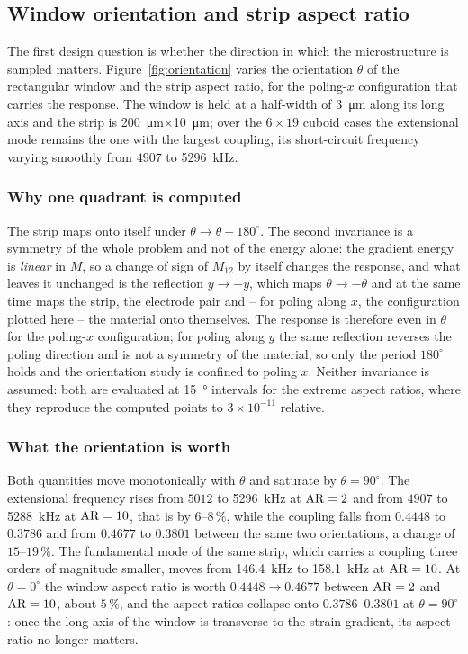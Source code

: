 

\FloatBarrier
\subsection{Window orientation and strip aspect ratio}
\label{sec:orientation}

The first design question is whether the direction in which the microstructure
is sampled matters. Figure~\ref{fig:orientation} varies the orientation
$\theta$ of the rectangular window and the strip aspect ratio, for the
poling-$x$ configuration that carries the response. The window is held at a
half-width of \SI{3}{\micro\metre} along its long axis and the strip is
\SI{200}{\micro\metre}$\times$\SI{10}{\micro\metre}; over the $6\times19$
cuboid cases the extensional mode remains the one with the largest coupling,
its short-circuit frequency varying smoothly from $4907$ to \SI{5296}{kHz}.

\subsubsection{Why one quadrant is computed}

The strip maps onto itself under $\theta\to\theta+180^\circ$. The second
invariance is a symmetry of the whole problem and not of the energy alone: the
gradient energy is \emph{linear} in $M$, so a change of sign of $M_{12}$ by
itself changes the response, and what leaves it unchanged is the reflection
$y\to-y$, which maps $\theta\to-\theta$ and at the same time maps the strip,
the electrode pair and -- for poling along $x$, the configuration plotted here
-- the material onto themselves. The response is therefore even in $\theta$ for
the poling-$x$ configuration; for poling along $y$ the same reflection reverses
the poling direction and is not a symmetry of the material, so only the period
$180^\circ$ holds and the orientation study is confined to poling $x$. Neither
invariance is assumed: both are evaluated at \SI{15}{\degree} intervals for the
extreme aspect ratios, where they reproduce the computed points to
$3\times10^{-11}$ relative.

\subsubsection{What the orientation is worth}

Both quantities move monotonically with $\theta$ and saturate by
$\theta=90^\circ$. The extensional frequency rises from $5012$ to
\SI{5296}{kHz} at ${\rm AR}=2$ and from $4907$ to \SI{5288}{kHz} at
${\rm AR}=10$, that is by $6$--$8\,\%$, while the coupling falls from $0.4448$
to $0.3786$ and from $0.4677$ to $0.3801$ between the same two orientations, a
change of $15$--$19\,\%$. The fundamental mode of the same strip, which carries
a coupling three orders of magnitude smaller, moves from \SI{146.4}{kHz} to
\SI{158.1}{kHz} at ${\rm AR}=10$. At $\theta=0^\circ$ the window aspect ratio is
worth $0.4448\to0.4677$ between ${\rm AR}=2$ and ${\rm AR}=10$, about
$5\,\%$, and the aspect ratios collapse onto $0.3786$--$0.3801$ at
$\theta=90^\circ$: once the long axis of the window is transverse to the strain
gradient, its aspect ratio no longer matters.

